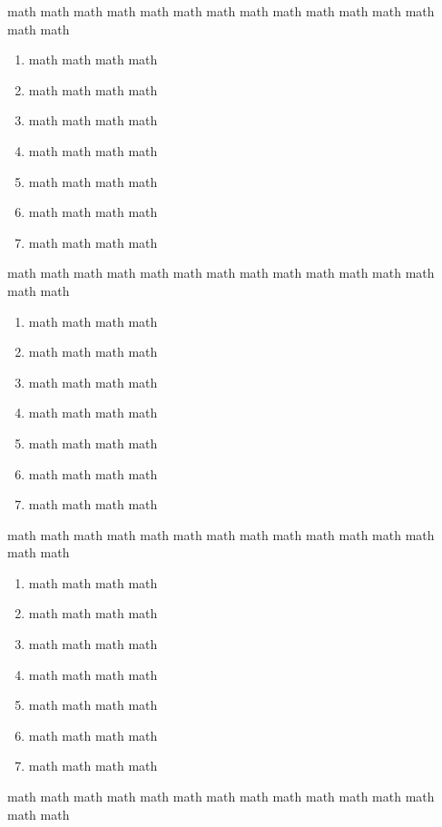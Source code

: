 \documentclass[12pt,a4paper]{article}
\begin{document}
\begin{multicols}{2}
\begin{Exercice}
\end{Exercice}
\begin{Exercice}math math math math math math math math math math math math math math math
\begin{enumerate}[label=\textbf{\color{gris}\arabic*.}]
    \item math math math math
    \item math math math math
    \item math math math math
    \item math math math math
    \item math math math math
    \item math math math math
    \item math math math math
\end{enumerate}
\end{Exercice}
\begin{Exercice}math math math math math math math math math math math math math math math
\begin{enumerate}[label=\textbf{\color{gris}\arabic*.}]
    \item math math math math
    \item math math math math
    \item math math math math
    \item math math math math
    \item math math math math
    \item math math math math
    \item math math math math
\end{enumerate}
\end{Exercice}
\begin{Exercice}math math math math math math math math math math math math math math math
\begin{enumerate}[label=\textbf{\color{gris}\arabic*.}]
    \item math math math math
    \item math math math math
    \item math math math math
    \item math math math math
    \item math math math math
    \item math math math math
    \item math math math math
\end{enumerate}
\end{Exercice}
\begin{Exercice}math math math math math math math math math math math math math math math

\end{Exercice}
\end{multicols}
\end{document}
